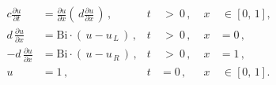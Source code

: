 \begin{align}
	  c \frac{\partial u}{\partial t} & = \frac{\partial u}{\partial x} \left( \, d \frac{\partial u}{\partial x} \, \right) \,,
	& t & \ > \ 0\,, \;&  x & \ \in \ \big[ \, 0, \, 1 \, \big] \,, \\[3pt]
	  d \, \frac{\partial u}{\partial x} & = \mathrm{Bi} \cdot \left( \, u - u_{\,L} \, \right)  \,,
	& t & \ > \ 0\,, \,& x & = 0 \,, \\[3pt]
	 -d \, \frac{\partial u}{\partial x} & = \mathrm{Bi} \cdot \left( \, u - u_{\,R} \, \right)  \,,
	& t & \ > \ 0\,, \,&   x & = 1 \,, \\[3pt]
	 u & = 1 \,,
	& t & = 0\,, \,& x & \ \in \ \big[ \, 0, \, 1 \, \big] \,.
	\end{align}
